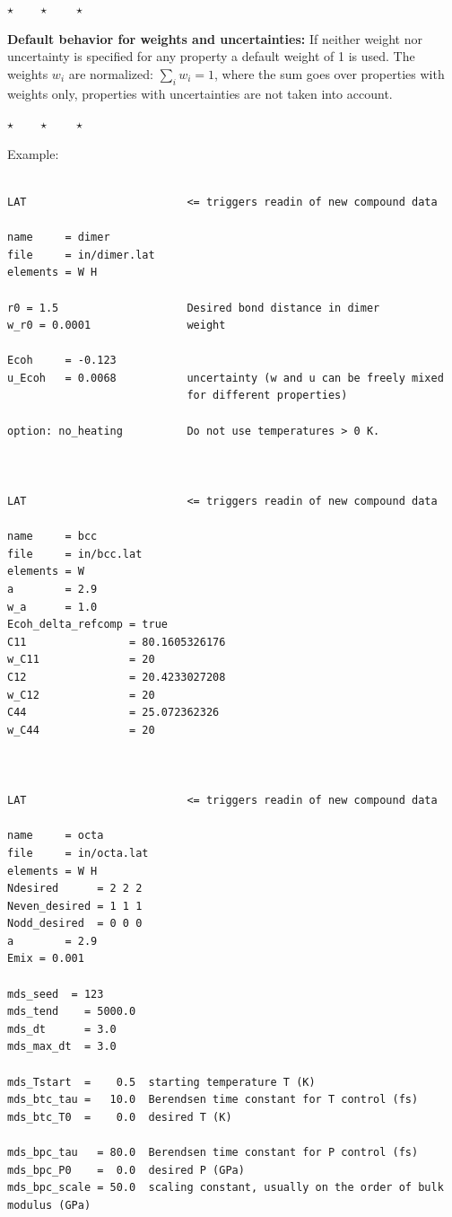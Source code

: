 \documentclass[a4paper,12pt,pdftex,onecolumn]{article}
\newcommand{\stars}{\begin{center}%
\vspace{1em plus 0.5em minus 0.5em}%
$\star \qquad \star \qquad \star$%
\vspace{1em plus 0.5em minus 0.5em}%
\end{center}}
\begin{document}
\stars

\textbf{Default behavior for weights and uncertainties:}
If neither weight nor uncertainty is specified for any property a default weight of 1
is used. The weights $w_i$ are normalized: $\sum_i w_i = 1$, where the sum goes over
properties with weights only, properties with uncertainties are not taken into account.


\stars

Example:

\begin{Verbatim}[fontsize=\relsize{-1},frame=single]

LAT                         <= triggers readin of new compound data

name     = dimer
file     = in/dimer.lat
elements = W H

r0 = 1.5                    Desired bond distance in dimer
w_r0 = 0.0001               weight

Ecoh     = -0.123
u_Ecoh   = 0.0068           uncertainty (w and u can be freely mixed
                            for different properties)

option: no_heating          Do not use temperatures > 0 K.



LAT                         <= triggers readin of new compound data

name     = bcc
file     = in/bcc.lat
elements = W
a        = 2.9
w_a      = 1.0
Ecoh_delta_refcomp = true
C11                = 80.1605326176
w_C11              = 20
C12                = 20.4233027208
w_C12              = 20
C44                = 25.072362326
w_C44              = 20



LAT                         <= triggers readin of new compound data

name     = octa
file     = in/octa.lat
elements = W H
Ndesired      = 2 2 2
Neven_desired = 1 1 1
Nodd_desired  = 0 0 0
a        = 2.9
Emix = 0.001

mds_seed  = 123
mds_tend    = 5000.0
mds_dt      = 3.0
mds_max_dt  = 3.0

mds_Tstart  =    0.5  starting temperature T (K)
mds_btc_tau =   10.0  Berendsen time constant for T control (fs)
mds_btc_T0  =    0.0  desired T (K)

mds_bpc_tau   = 80.0  Berendsen time constant for P control (fs)
mds_bpc_P0    =  0.0  desired P (GPa)
mds_bpc_scale = 50.0  scaling constant, usually on the order of bulk modulus (GPa)

\end{Verbatim}
\end{document}
